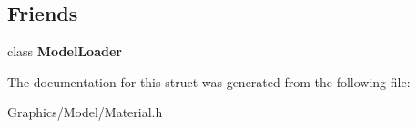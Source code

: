 \subsection*{Friends}
\begin{DoxyCompactItemize}
\item 
\mbox{\label{structce_1_1graphics_1_1_material_ac22dade55c1e8f81ea3e0892cd321190}} 
class {\bfseries Model\+Loader}
\end{DoxyCompactItemize}


The documentation for this struct was generated from the following file\+:\begin{DoxyCompactItemize}
\item 
Graphics/\+Model/Material.\+h\end{DoxyCompactItemize}
